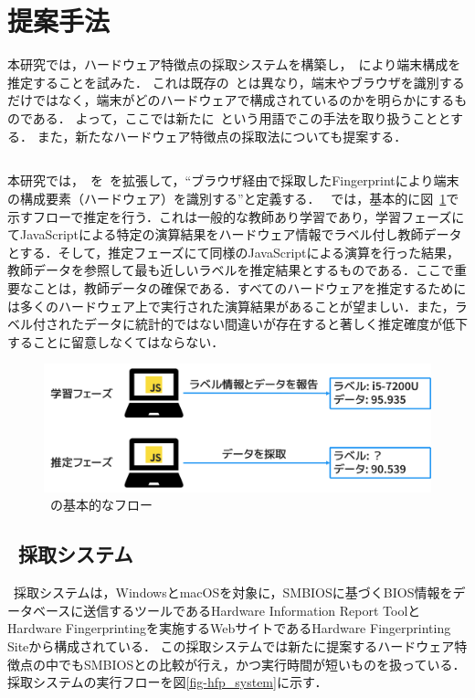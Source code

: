 \newpage
\section{提案手法}
本研究では，ハードウェア特徴点の採取システムを構築し，\fp~により端末構成を推定することを試みた．
これは既存の\fp~とは異なり，端末やブラウザを識別するだけではなく，端末がどのハードウェアで構成されているのかを明らかにするものである．
よって，ここでは新たに\hfp~という用語でこの手法を取り扱うこととする．
また，新たなハードウェア特徴点の採取法についても提案する．

\subsection{\hfp}
本研究では，\hfp~を\fp~を拡張して，``ブラウザ経由で採取したFingerprintにより端末の構成要素（ハードウェア）を識別する''と定義する．
\hfp~では，基本的に図~\ref{fig-hfp}で示すフローで推定を行う．これは一般的な教師あり学習であり，学習フェーズにてJavaScriptによる特定の演算結果をハードウェア情報でラベル付し教師データとする．そして，推定フェーズにて同様のJavaScriptによる演算を行った結果，教師データを参照して最も近しいラベルを推定結果とするものである．ここで重要なことは，教師データの確保である．すべてのハードウェアを推定するためには多くのハードウェア上で実行された演算結果があることが望ましい．また，ラベル付されたデータに統計的ではない間違いが存在すると著しく推定確度が低下することに留意しなくてはならない．
\begin{figure}[H]
	\centering
    \includegraphics[width=\textwidth,pagebox=artbox]{fig/hfp.png}
    \caption{\hfp~の基本的なフロー}
    \label{fig-hfp}
\end{figure}

\subsection{\hfp~採取システム}
\hfp~採取システムは，WindowsとmacOSを対象に，SMBIOSに基づくBIOS情報をデータベースに送信するツールであるHardware Information Report ToolとHardware Fingerprintingを実施するWebサイトであるHardware Fingerprinting Siteから構成されている．
この採取システムでは新たに提案するハードウェア特徴点の中でもSMBIOSとの比較が行え，かつ実行時間が短いものを扱っている．
採取システムの実行フローを図\ref{fig-hfp_system}に示す．

